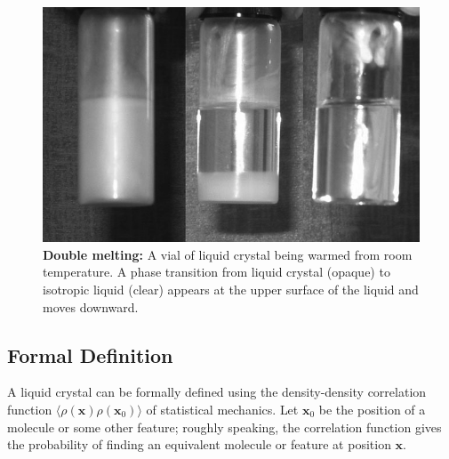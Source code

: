 \documentclass[twocolumn,aps,prl]{revtex4-1} %
\begin{document}
\begin{figure}
    \includegraphics[width=\columnwidth]{LC_tube.png}
    \caption{\textbf{Double melting:} \cite{dunmur_soap_2011} A vial of liquid crystal being warmed from room temperature.  A phase transition from liquid crystal (opaque) to isotropic liquid (clear) appears at the upper surface of the liquid and moves downward.}
    \label{fig:LC_tube}
\end{figure}


\subsection{Formal Definition}

A liquid crystal can be formally defined using the density-density correlation function $\langle\rho(\mathbf{x})\rho(\mathbf{x}_0)\rangle$ of statistical mechanics. \cite{gennes_physics_1974}  Let $\mathbf{x}_0$ be the position of a molecule or some other feature; roughly speaking, the correlation function gives the probability of finding an equivalent molecule or feature at position $\mathbf{x}$.
\end{document}
